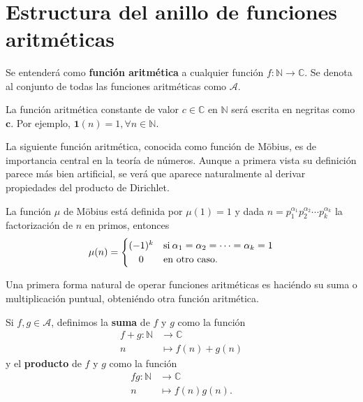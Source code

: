 \newpage
\thispagestyle{empty}
\
\newpage
{}
\section{Estructura del anillo de funciones aritméticas}

\begin{definition}
Se entenderá como \textbf{función aritmética} a cualquier función $f : \mathbb{N} \longrightarrow \mathbb{C}$. Se denota al conjunto de todas las funciones aritméticas como $\mathcal{A}$.
\end{definition}

\begin{definition}
La función aritmética constante de valor $c \in \mathbb{C}$ en $\mathbb{N}$ será escrita en negritas como $\mathbf{c}$. Por ejemplo, $\mathbf{1}(n)=1, \forall n \in \mathbb{N}$.
\end{definition}

La siguiente función aritmética, conocida como función de Möbius, es de importancia central en la teoría de números. Aunque a primera vista su definición parece más bien artificial, se verá que aparece naturalmente al derivar propiedades del producto de Dirichlet.

\begin{definition}
La función $\mu$ de Möbius está definida por $\mu(1)=1$ y dada $n=p_1^{\alpha_1}p_2^{\alpha_2}\cdots p_k^{\alpha_k}$ la factorización de $n$ en primos, entonces
\begin{equation*}
	\mu(n) =
		\begin{cases}
			(-1)^k & \text{si} \: \alpha_1=\alpha_2=\cdots=\alpha_k=1 \\ \hfil
			0 & \text{en otro caso.}
		\end{cases}
\end{equation*}
\end{definition}

Una primera forma natural de operar funciones aritméticas es haciéndo su suma o multiplicación puntual, obteniéndo otra función aritmética.

\begin{definition}
Si $f,g \in \mathcal{A}$, definimos la \textbf{suma} de $f$ y $g$ como la función \begin{align*}
    f+g : \mathbb{N} & \longrightarrow \mathbb{C} \\
    n & \longmapsto f(n)+g(n)
\end{align*}
y el \textbf{producto} de $f$ y $g$ como la función
\begin{align*}
    fg : \mathbb{N} & \longrightarrow \mathbb{C} \\
    n & \longmapsto f(n)g(n).
\end{align*}
\end{definition}


